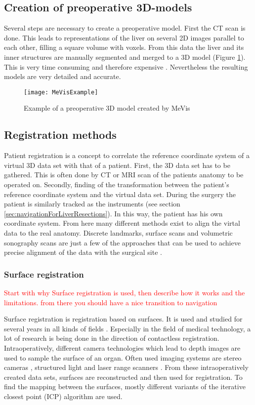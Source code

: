 \subsection{Creation of preoperative 3D-models}
Several steps are necessary to create a preoperative model. First the 
CT scan is done. This leads to representations of the liver on several 2D images parallel
to each other, filling a square volume with voxels. From this data the liver and
its inner structures are manually segmented and merged to a 3D model (Figure \ref{fig:MeVisExample}). This is very
time consuming and therefore expensive \cite{numminen2005preoperative}.
Nevertheless the resulting models are very detailed and accurate.
\begin{figure}[H]
  \centering
 \texttt{[image: MeVisExample]}
 \caption{Example of a preoperative 3D model created by MeVis}%
  \label{fig:MeVisExample}
\end{figure}

\subsection{Registration methods}
Patient registration is a concept to correlate the reference coordinate system
of a virtual 3D data set with that of a patient. First, the 3D data set has to
be gathered. This is often done by CT or MRI scan of the patients anatomy to be
operated on. Secondly, finding of the transformation between the patient's
reference coordinate system and the virtual data set. During the surgery the patient is similarly
tracked as the instruments (see section \ref{sec:navigationForLiverResections}).
In this way, the patient has his own coordinate system. From here many different
methods exist to align the virtal data to the real anatomy.
Discrete landmarks, surface scans and
volumetric sonography scans are just a few of the approaches that can be
used to achieve precise alignment of the data with the
surgical site \cite{banz2016intraoperative}. 

\subsubsection{Surface registration}
\textcolor{red}{Start with why Surface registration is used, then describe how it works and the limitations. from there you should have a nice transition to navigation}

Surface registration is registration based on surfaces. It is used and studied
for several years in all kinds of fields \cite{ramos2015review}. Especially in
the field of medical technology, a lot of research is being done in the
direction of contactless registration. Intraoperatively, different camera technologies which lead
to depth images are used to sample the surface of an organ. Often used imaging systems are stereo cameras
\cite{furukawa2010accurate}, structured light \cite{salvi2004pattern} and
laser range scanners \cite{cash2003incorporation}. From these intraoperatively
created data sets, surfaces are reconstructed and then used for registration. To
find the mapping between the surfaces, mostly different variants of the iterative
closest point (ICP) \cite{besl1992method} algorithm are used. 

